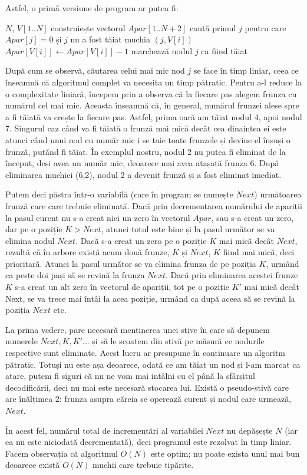 Astfel, o primă versiune de program ar putea fi:

\vspace{\algskip}
\begin{algorithmic}[1]
  \REQUIRE $N$, $V[1..N]$
  \STATE construiește vectorul $Apar[1..N+2]$
  \STATE caută primul $j$ pentru care $Apar[j]=0$ și $j$ nu a fost tăiat
  \PRINT muchia $(j,V[i])$
  \STATE $Apar[V[i]] \leftarrow Apar[V[i]]-1$
  \STATE marchează nodul $j$ ca fiind tăiat
  \ENDFOR
\end{algorithmic}

După cum se observă, căutarea celui mai mic nod $j$ se face în timp liniar,
ceea ce înseamnă că algoritmul complet va necesita un timp pătratic. Pentru
a-l reduce la o complexitate liniară, începem prin a observa că la fiecare pas
alegem frunza cu numărul cel mai mic. Aceasta înseamnă că, în general, numărul
frunzei alese spre a fi tăiată va crește la fiecare pas. Astfel, prima oară am
tăiat nodul 4, apoi nodul 7. Singurul caz când va fi tăiată o frunză mai mică
decât cea dinaintea ei este atunci când unui nod cu număr mic i se taie toate
frunzele și devine el însuși o frunză, putănd fi tăiat. În exemplul nostru,
nodul 2 nu putea fi eliminat de la început, deși avea un număr mic, deoarece
mai avea atașată frunza 6. După eliminarea muchiei (6,2), nodul 2 a devenit
frunză și a fost eliminat imediat.

Putem deci păstra într-o variabilă (care în program se numește $Next$)
următoarea frunză care care trebuie eliminată. Dacă prin decrementarea
numărului de apariții la pasul curent nu s-a creat nici un zero în vectorul
$Apar$, sau s-a creat un zero, dar pe o poziție $K>Next$, atunci totul este
bine și la pasul următor se va elimina nodul $Next$. Dacă s-a creat un zero pe
o poziție $K$ mai mică decât $Next$, rezultă că în arbore există acum două
frunze, $K$ și $Next$, $K$ fiind mai mică, deci prioritară. Atunci la pasul
următor se va elimina frunza de pe poziția $K$, urmând ca peste doi pași să se
revină la frunza $Next$. Dacă prin eliminarea acestei frunze $K$ s-a creat un
alt zero în vectorul de apariții, tot pe o poziție $K'$ mai mică decât Next,
se va trece mai întâi la acea poziție, urmând ca după aceea să se revină la
poziția $Next$ etc.

La prima vedere, pare necesară menținerea unei stive în care să depunem
numerele $Next, K, K'$... și să le scoatem din stivă pe măsură ce nodurile
respective sunt eliminate. Acest lucru ar presupune în continuare un algoritm
pătratic. Totuși nu este așa deoarece, odată ce am tăiat un nod și l-am marcat
ca atare, putem fi siguri că nu ne vom mai intâlni cu el până la sfârșitul
decodificării, deci nu mai este necesară stocarea lui. Există o pseudo-stivă
care are înălțimea 2: frunza asupra căreia se operează curent și nodul care
urmează, $Next$.

În acest fel, numărul total de incrementări al variabilei $Next$ nu depășește
$N$ (iar ea nu este niciodată decrementată), deci programul este rezolvat în
timp liniar. Facem observația că algoritmul $O(N)$ este optim; nu poate exista
unul mai bun deoarece există $O(N)$ muchii care trebuie tipărite.

\inputminted{c}{src/problem8.c}
